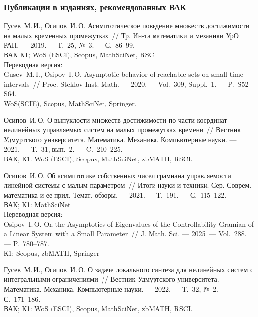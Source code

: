 \documentclass[../main.tex]{subfiles}
\begin{document}
\begin{thebibliography}{99}
\subsubsection*{Публикации в изданиях, рекомендованных ВАК}
Гусев~М.\,И., Осипов~И.\,О. Асимптотическое поведение множеств достижимости на малых временных промежутках~// Тр. Ин-та математики и механики УрО РАН. --- 2019. --- Т.~25, №~3. --- С.~86--99.
 \\
ВАК К1; WoS (ESCI), Scopus, MathSciNet, RSCI
\\ Переводная версия: \\
Gusev~M.\,I., Osipov~I.\,O. Asymptotic behavior of reachable sets on small time intervals~// Proc. Steklov Inst. Math. --- 2020. --- Vol.~309, Suppl.~1. --- P.~S52--S64. \\
WoS(SCIE), Scopus, MathSciNet, Springer.

Осипов~И.\,О. О выпуклости множеств достижимости по части координат нелинейных управляемых систем на малых промежутках времени~// Вестник Удмуртского университета. Математика. Механика. Компьютерные науки. --- 2021. --- Т.~31, вып.~2. --- C.~210--225.
 \\
 ВАК; К1: WoS (ESCI), Scopus, MathSciNet, zbMATH, RSCI.

Осипов~И.\,О. Об асимптотике собственных чисел грамиана управляемости линейной системы с малым параметром~// Итоги науки и техники. Сер. Соврем. математика и ее прил. Темат. обзоры. --- 2021. --- Т.~191. --- С.~115--122.
\\ ВАК; К1: MathSciNet
\\Переводная версия: \\
Osipov~I.\,O. On the Asymptotics of Eigenvalues of the Controllability Gramian of a Linear System with a Small Parameter~// J. Math. Sci. --- 2025. --- Vol.~288. --- P.~780--787. 
 \\
К1: Scopus, zbMATH, Springer

Гусев~М.\,И., Осипов~И.\,О. О задаче локального синтеза для нелинейных систем с интегральными ограничениями~// Вестник Удмуртского университета. Математика. Механика. Компьютерные науки. --- 2022. --- Т.~32, №~2. --- С.~171--186. 
 \\
 ВАК; К1: WoS (ESCI), Scopus, MathSciNet, zbMATH, RSCI.



\end{thebibliography}
\end{document}
